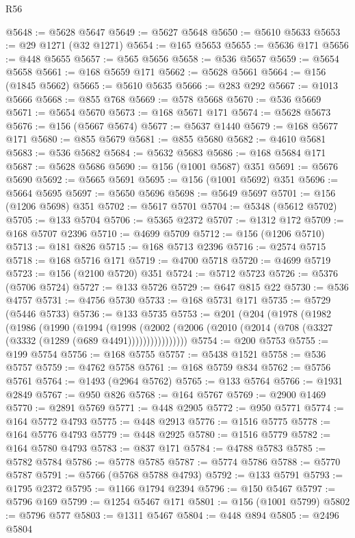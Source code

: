 \begin{lexlean}{R56}
\begin{coremodule}
@5648 := @5628 @5647
@5649 := @5627 @5648
@5650 := @5610 @5633
@5653 := @29 @1271 (@32 @1271)
@5654 := @165 @5653
@5655 := @5636 @171
@5656 := @448 @5655
@5657 := @565 @5656
@5658 := @536 @5657
@5659 := @5654 @5658
@5661 := @168 @5659 @171
@5662 := @5628 @5661
@5664 := @156 (@1845 @5662)
@5665 := @5610 @5635
@5666 := @283 @292
@5667 := @1013 @5666
@5668 := @855 @768
@5669 := @578 @5668
@5670 := @536 @5669
@5671 := @5654 @5670
@5673 := @168 @5671 @171
@5674 := @5628 @5673
@5676 := @156 (@5667 @5674)
@5677 := @5637 @1440
@5679 := @168 @5677 @171
@5680 := @855 @5679
@5681 := @855 @5680
@5682 := @4610 @5681
@5683 := @536 @5682
@5684 := @5632 @5683
@5686 := @168 @5684 @171
@5687 := @5628 @5686
@5690 := @156 (@1001 @5687) @351
@5691 := @5676 @5690
@5692 := @5665 @5691
@5695 := @156 (@1001 @5692) @351
@5696 := @5664 @5695
@5697 := @5650 @5696
@5698 := @5649 @5697
@5701 := @156 (@1206 @5698) @351
@5702 := @5617 @5701
@5704 := @5348 (@5612 @5702)
@5705 := @133 @5704
@5706 := @5365 @2372
@5707 := @1312 @172
@5709 := @168 @5707 @2396
@5710 := @4699 @5709
@5712 := @156 (@1206 @5710)
@5713 := @181 @826
@5715 := @168 @5713 @2396
@5716 := @2574 @5715
@5718 := @168 @5716 @171
@5719 := @4700 @5718
@5720 := @4699 @5719
@5723 := @156 (@2100 @5720) @351
@5724 := @5712 @5723
@5726 := @5376 (@5706 @5724)
@5727 := @133 @5726
@5729 := @647 @815 @22
@5730 := @536 @4757
@5731 := @4756 @5730
@5733 := @168 @5731 @171
@5735 := @5729 (@5446 @5733)
@5736 := @133 @5735
@5753 := @201
    (@204
      (@1978
        (@1982
          (@1986
            (@1990
              (@1994
                (@1998
                  (@2002 (@2006 (@2010 (@2014 (@708 (@3327 (@3332 (@1289 (@689 @4491))))))))))))))))
@5754 := @200 @5753
@5755 := @199 @5754
@5756 := @168 @5755
@5757 := @5438 @1521
@5758 := @536 @5757
@5759 := @4762 @5758
@5761 := @168 @5759 @834
@5762 := @5756 @5761
@5764 := @1493 (@2964 @5762)
@5765 := @133 @5764
@5766 := @1931 @2849
@5767 := @950 @826
@5768 := @164 @5767
@5769 := @2900 @1469
@5770 := @2891 @5769
@5771 := @448 @2905
@5772 := @950 @5771
@5774 := @164 @5772 @4793
@5775 := @448 @2913
@5776 := @1516 @5775
@5778 := @164 @5776 @4793
@5779 := @448 @2925
@5780 := @1516 @5779
@5782 := @164 @5780 @4793
@5783 := @837 @171
@5784 := @4788 @5783
@5785 := @5782 @5784
@5786 := @5778 @5785
@5787 := @5774 @5786
@5788 := @5770 @5787
@5791 := @5766 (@5768 @5788 @4793)
@5792 := @133 @5791
@5793 := @1795 @2372
@5795 := @1166 @1794 @2394
@5796 := @150 @5467
@5797 := @5796 @169
@5799 := @1254 @5467 @171
@5801 := @156 (@1001 @5799)
@5802 := @5796 @577
@5803 := @1311 @5467
@5804 := @448 @894
@5805 := @2496 @5804

\end{coremodule}
\end{lexlean}
